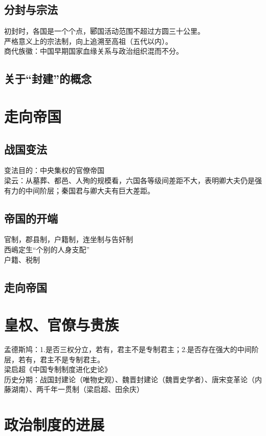 \documentclass[twoside]{article}
\begin{document}
\subsection{分封与宗法}
初封时，各国是一个个点，郾国活动范围不超过方圆三十公里。\\
严格意义上的宗法制，向上追溯至高祖（五代以内）。\\
商代族徽：中国早期国家血缘关系与政治组织混而不分。\\
\subsection{关于``封建''的概念}

\section{走向帝国}
\subsection{战国变法}
变法目的：中央集权的官僚帝国\\
梁云：从墓葬、都邑、人殉的规模看，六国各等级间差距不大，表明卿大夫仍是强有力的中间阶层；秦国君与卿大夫有巨大差距。\\
\subsection{帝国的开端}
官制，郡县制，户籍制，连坐制与告奸制\\
西嶋定生``个别的人身支配''\\
户籍、税制\\
\subsection{走向帝国}

\section{皇权、官僚与贵族}
孟德斯鸠：1.是否三权分立，若有，君主不是专制君主；2.是否存在强大的中间阶层，若有，君主不是专制君主。\\
梁启超《中国专制制度进化史论》\\
历史分期：战国封建论（唯物史观）、魏晋封建论（魏晋史学者）、唐宋变革论（内藤湖南）、两千年一贯制（梁启超、田余庆）

\section{政治制度的进展}
\end{document}
